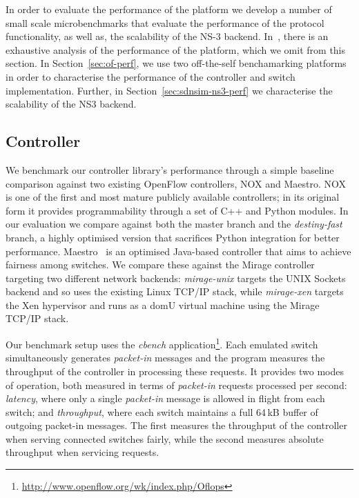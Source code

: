 In order to evaluate the performance of the \sdnsim platform we develop a number
of small scale microbenchmarks that evaluate the performance of the \of
protocol functionality, as well as, the scalability of the NS-3 backend.
In~\cite{madhavapeddy2013}, there is an exhaustive analysis of the performance of the
\mirage platform, which we omit from this section. In Section~\ref{sec:of-perf},
we use two off-the-self \of benchamarking platforms in order to characterise the 
performance of the controller and switch implementation. Further, in
Section~\ref{sec:sdnsim-ns3-perf} we characterise the scalability of the NS3 
backend.


\subsection{\mirage Controller}

We benchmark our controller library's performance through a simple baseline
comparison against two existing OpenFlow controllers, NOX and Maestro.
NOX~\cite{nox} is one of the first and most mature publicly available \of
controllers; in its original form it provides programmability through a set of
C++ and Python modules. In our evaluation we compare against both the master
branch and the \emph{destiny-fast} branch, a highly optimised version that
sacrifices Python integration for better performance. Maestro~\cite{cai2011} is
an optimised Java-based controller that aims to achieve fairness among switches.
We compare these against the Mirage controller targeting two different network
backends: \emph{mirage-unix} targets the UNIX Sockets backend and so uses the
existing Linux TCP/IP stack, while \emph{mirage-xen} targets the Xen hypervisor
and runs as a domU virtual machine using the Mirage TCP/IP stack.

Our benchmark setup uses the \emph{cbench}
application\footnote{\url{http://www.openflow.org/wk/index.php/Oflops}}. Each
emulated switch simultaneously generates \emph{packet-in} messages and the
program measures the throughput of the controller in processing these requests.
It provides two modes of operation, both measured in terms of \emph{packet-in}
requests processed per second: \emph{latency}, where only a single
\emph{packet-in} message is allowed in flight from each switch; and
\emph{throughput}, where each switch maintains a full 64\,kB buffer of outgoing
packet-in messages. The first measures the throughput of the controller when
serving connected switches fairly, while the second measures absolute throughput
when servicing requests.
                                                                       
